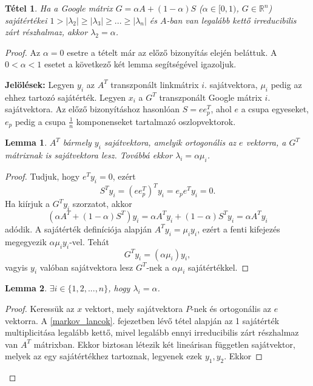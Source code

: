 \documentclass[12pt,a4paper]{article}
\newtheorem{tetel}{Tétel}
\newtheorem{lemma}{Lemma}
\begin{document}
\begin{tetel}
	Ha a Google mátrix $G = \alpha A + (1-\alpha)S$ ($\alpha \in [0,1)$, $G \in \mathbb{R}^n$) sajátértékei $ 1 > |\lambda_2| \geq |\lambda_3| \geq ... \geq |\lambda_n |$ és $A$-ban van legalább kettő irreducibilis zárt részhalmaz, akkor $\lambda_2 = \alpha$.
\end{tetel}
\begin{proof}
	Az $\alpha = 0$ esetre a tételt már az előző bizonyítás elején beláttuk. A $0 < \alpha < 1$ esetet a következő két lemma segítségével igazoljuk.
	
	\vspace{0.1cm}
	\textbf{Jelölések:} Legyen $y_i$ az $A^T$ transzponált linkmátrix $i.$ sajátvektora, $\mu_i$ pedig az ehhez tartozó sajátérték. Legyen $x_i$ a $G^T$ transzponált Google mátrix $i.$ sajátvektora. Az előző bizonyításhoz hasonlóan $S = e e_p^T$, ahol $e$ a csupa egyeseket, $e_p$ pedig a csupa $\frac{1}{n}$ komponenseket tartalmazó oszlopvektorok.
	
	\begin{lemma}
		$A^T$ bármely $y_i$ sajátvektora, amelyik ortogonális az $e$ vektorra, a $G^T$ mátrixnak is sajátvektora lesz. Továbbá ekkor $\lambda_i = \alpha \mu_i$.
	\end{lemma}
	\vspace{-0.5cm}
	\begin{proof}
		Tudjuk, hogy $e^T y_i = 0$, ezért
		\[ S^T y_i = (e e_p^T)^T y_i = e_p e^T y_i = 0. \]
		Ha kiírjuk a $G^T y_i$ szorzatot, akkor
		\[ (\alpha A^T + (1-\alpha) S^T ) y_i = \alpha A^T y_i + (1-\alpha) S^T y_i = \alpha A^T y_i \]
		adódik. A sajátérték definíciója alapján $A^T y_i = \mu_i y_i$, ezért a fenti kifejezés megegyezik $\alpha \mu_i y_i$-vel. Tehát
		\[ G^T y_i = (\alpha \mu_i) y_i, \]
		vagyis $y_i$ valóban sajátvektora lesz $G^T$-nek a $\alpha \mu_i$ sajátértékkel.
		\phantom\qedhere
	\end{proof} 

	\begin{lemma}
		$\exists i \in \{ 1,2,...,n \}$, hogy $\lambda_i = \alpha$.
	\end{lemma}
	\vspace{-0.5cm}
	\begin{proof}
		Keressük az $x$ vektort, mely sajátvektora $P$-nek és ortogonális az $e$ vektorra. A \ref{markov_lancok}. fejezetben lévő tétel alapján az 1 sajátérték multiplicitása legalább kettő, mivel legalább ennyi irreducibilis zárt részhalmaz van $A^T$ mátrixban. Ekkor biztosan létezik két lineárisan független sajátvektor, melyek az egy sajátértékhez tartoznak, legyenek ezek $y_1,y_2$. Ekkor
		

\end{proof}
\end{proof}
\end{document}
